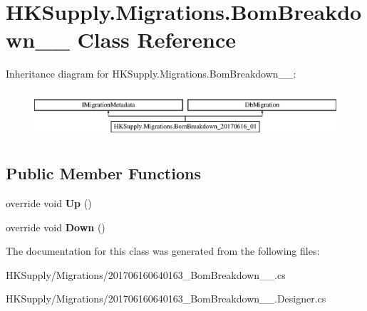 \hypertarget{class_h_k_supply_1_1_migrations_1_1_bom_breakdown__20170616__01}{}\section{H\+K\+Supply.\+Migrations.\+Bom\+Breakdown\+\_\+\_ Class Reference}
\label{class_h_k_supply_1_1_migrations_1_1_bom_breakdown__20170616__01}
Inheritance diagram for H\+K\+Supply.\+Migrations.\+Bom\+Breakdown\+\_\+\_\+:\begin{figure}[H]
\begin{center}
\leavevmode
\includegraphics[height=1.783440cm]{class_h_k_supply_1_1_migrations_1_1_bom_breakdown__20170616__01}
\end{center}
\end{figure}
\subsection*{Public Member Functions}
\begin{DoxyCompactItemize}
\item 
\mbox{\label{class_h_k_supply_1_1_migrations_1_1_bom_breakdown__20170616__01_ac8eeb321b36ca06125177edbf661e510}} 
override void {\bfseries Up} ()
\item 
\mbox{\label{class_h_k_supply_1_1_migrations_1_1_bom_breakdown__20170616__01_a52826f892a54345e21106b162ef09a90}} 
override void {\bfseries Down} ()
\end{DoxyCompactItemize}


The documentation for this class was generated from the following files\+:\begin{DoxyCompactItemize}
\item 
H\+K\+Supply/\+Migrations/201706160640163\+\_\+\+Bom\+Breakdown\+\_\+\_.\+cs\item 
H\+K\+Supply/\+Migrations/201706160640163\+\_\+\+Bom\+Breakdown\+\_\+\_.\+Designer.\+cs\end{DoxyCompactItemize}
